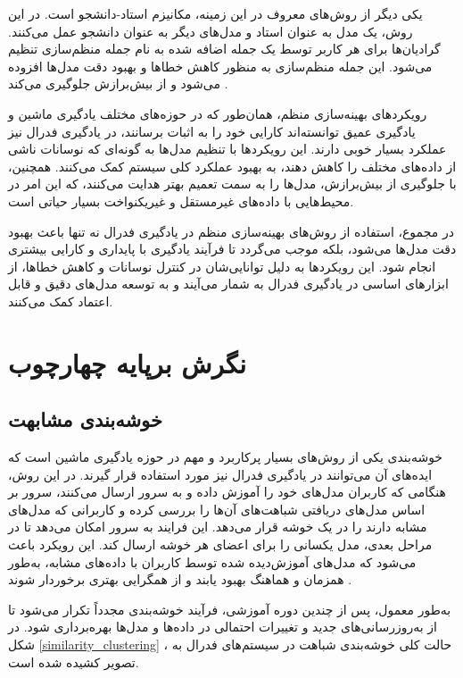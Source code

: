 یکی دیگر از روش‌های معروف در این زمینه، مکانیزم استاد-دانشجو%
است. در این روش، یک مدل به عنوان استاد و مدل‌های دیگر به عنوان دانشجو عمل می‌کنند. گرادیان‌ها برای هر کاربر توسط یک جمله اضافه شده به نام جمله منظم‌سازی%
تنظیم می‌شود. این جمله منظم‌سازی به منظور کاهش خطاها و بهبود دقت مدل‌ها افزوده می‌شود و از بیش‌برازش%
جلوگیری می‌کند
\cite{li2020communication}.

رویکردهای بهینه‌سازی منظم، همان‌طور که در حوزه‌های مختلف یادگیری ماشین و یادگیری عمیق توانسته‌اند کارایی خود را به اثبات برسانند، در یادگیری فدرال نیز عملکرد بسیار خوبی دارند. این رویکردها با تنظیم مدل‌ها به گونه‌ای که نوسانات ناشی از داده‌های مختلف را کاهش دهند، به بهبود عملکرد کلی سیستم کمک می‌کنند. همچنین، با جلوگیری از بیش‌برازش، مدل‌ها را به سمت تعمیم بهتر هدایت می‌کنند، که این امر در محیط‌هایی با داده‌های غیرمستقل و غیریکنواخت بسیار حیاتی است.

در مجموع، استفاده از روش‌های بهینه‌سازی منظم در یادگیری فدرال نه تنها باعث بهبود دقت مدل‌ها می‌شود، بلکه موجب می‌گردد تا فرآیند یادگیری با پایداری و کارایی بیشتری انجام شود. این رویکردها به دلیل توانایی‌شان در کنترل نوسانات و کاهش خطاها، از ابزارهای اساسی در یادگیری فدرال به شمار می‌آیند و به توسعه مدل‌های دقیق و قابل اعتماد کمک می‌کنند.



\section{نگرش برپایه چهارچوب}
\subsection{
	خوشه‌بندی مشابهت%
}
خوشه‌بندی یکی از روش‌های بسیار پرکاربرد و مهم در حوزه یادگیری ماشین است که ایده‌های آن می‌توانند در یادگیری فدرال نیز مورد استفاده قرار گیرند. در این روش، هنگامی که کاربران مدل‌های خود را آموزش داده و به سرور ارسال می‌کنند، سرور بر اساس مدل‌های دریافتی شباهت‌های آن‌ها را بررسی کرده و کاربرانی که مدل‌های مشابه دارند را در یک خوشه قرار می‌دهد. این فرایند به سرور امکان می‌دهد تا در مراحل بعدی، مدل یکسانی را برای اعضای هر خوشه ارسال کند. این رویکرد باعث می‌شود که مدل‌های آموزش‌دیده شده توسط کاربران با داده‌های مشابه، به‌طور همزمان و هماهنگ بهبود یابند و از همگرایی بهتری برخوردار شوند
\cite{ghosh2019robust}.

به‌طور معمول، پس از چندین دوره آموزشی، فرآیند خوشه‌بندی مجدداً تکرار می‌شود تا از به‌روزرسانی‌های جدید و تغییرات احتمالی در داده‌ها و مدل‌ها بهره‌برداری شود. در شکل
\ref{similarity_clustering}%
، حالت کلی خوشه‌بندی شباهت در سیستم‌های فدرال به تصویر کشیده شده است.


